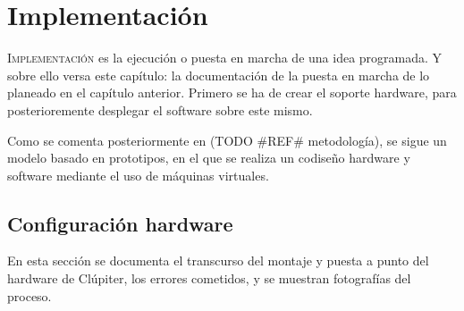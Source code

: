 \chapter{Implementación}
\label{chap:implementacion}

\lettrine{I}{mplementación} es la ejecución o puesta en marcha de una idea programada. Y sobre ello versa este capítulo: la documentación de la puesta en marcha de lo planeado en el capítulo anterior. Primero se ha de crear el soporte hardware, para posterioremente desplegar el software sobre este mismo.

Como se comenta posteriormente en (TODO \#REF\# metodología), se sigue un modelo basado en prototipos, en el que se realiza un codiseño hardware y software mediante el uso de máquinas virtuales.

\section{Configuración hardware}
\label{sec:configuracion_hardware}
En esta sección se documenta el transcurso del montaje y puesta a punto del hardware de Clúpiter, los errores cometidos, y se muestran fotografías del proceso.

